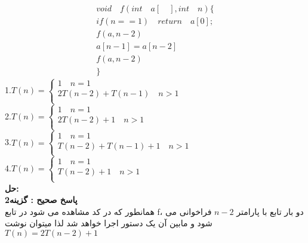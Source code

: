 \documentclass{book}
\begin{document}
\[
\begin{align*}
void \quad f(int\quad a[\quad], int\quad n) \lbrace \\
if(n==1)\quad return \quad a[0]; \\
f(a,n-2)\\
a[n-1]=a[n-2]\\
f(a,n-2)\\
\rbrace
\end{align*}
\]
1.$
T(n) =\begin{cases}
1 \quad n=1 \\
2T(n-2) + T(n-1) \quad n>1\\
    \end{cases}
    $
    \\
2.$
T(n) =\begin{cases}
1 \quad n=1 \\
2T(n-2) +1\quad n>1\\
\end{cases}
$
\\
3.$
T(n) =\begin{cases}
1 \quad n=1 \\
T(n-2) + T(n-1)+1 \quad n>1\\
\end{cases}
$
\\
4.$
T(n) =\begin{cases}
1 \quad n=1 \\
T(n-2) +1\quad n>1\\
\end{cases}
$
\\
\textbf{حل:}\\
\textbf{پاسخ صحیح : گزینه2}\\
همانطور که در کد مشاهده می شود در تابع f، دو بار تابع با پارامتر $n-2$ فراخوانی می شود و مابین آن یک دستور اجرا خواهد شد لذا میتوان نوشت
$T(n)=2T(n-2)+1$
\end{document}
